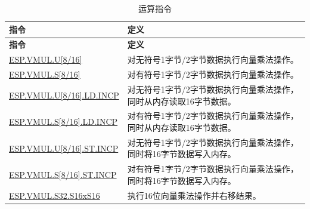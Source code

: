 \begin{longtable}[c]{|l|m{10cm}|}
    \caption{运算指令}
    \label{tab:pie-vmul-instructions}\\
    \hline
    \rowcolor{lightgray}
    \textbf{指令} & \textbf{定义} \\\hline
    \endfirsthead
    \rowcolor{lightgray}
    \textbf{指令} & \textbf{定义} \\\hline
    \endhead
    \endfoot

    \hyperref[instruction:ESPVMULU8]{ESP.VMUL.U[8/16]} & 对无符号1字节/2字节数据执行向量乘法操作。 \\\hline
    \hyperref[instruction:ESPVMULS8]{ESP.VMUL.S[8/16]} & 对有符号1字节/2字节数据执行向量乘法操作。 \\\hline
    \hyperref[instruction:ESPVMULU8LDINCP]{ESP.VMUL.U[8/16].LD.INCP} & 对无符号1字节/2字节数据执行向量乘法操作，同时从内存读取16字节数据。 \\\hline
    \hyperref[instruction:ESPVMULS8LDINCP]{ESP.VMUL.S[8/16].LD.INCP} & 对有符号1字节/2字节数据执行向量乘法操作，同时从内存读取16字节数据。 \\\hline
    \hyperref[instruction:ESPVMULU8STINCP]{ESP.VMUL.U[8/16].ST.INCP} & 对无符号1字节/2字节数据执行向量乘法操作，同时将16字节数据写入内存。 \\\hline
    \hyperref[instruction:ESPVMULS8STINCP]{ESP.VMUL.S[8/16].ST.INCP} & 对有符号1字节/2字节数据执行向量乘法操作，同时将16字节数据写入内存。 \\\hline
    \hyperref[instruction:ESPVMULS32S16XS16]{ESP.VMUL.S32.S16xS16} & 执行16位向量乘法操作并右移结果。
    \\\hline
\end{longtable}